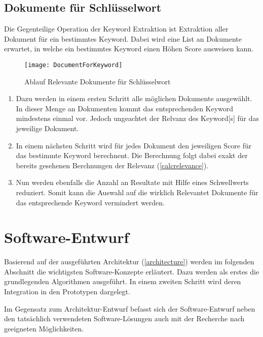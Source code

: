 \subsection{Dokumente für Schlüsselwort}
Die Gegenteilige Operation der \gls{Keyword} Extraktion ist Extraktion aller Dokument für ein bestimmtes  \gls{Keyword}. Dabei wird eine List an Dokumente erwartet, in welche ein bestimmtes \gls{Keyword} einen Höhen Score ausweisen kann. 

    \begin{figure}[H]
    \centering
    \texttt{[image: DocumentForKeyword]}
    \caption{Ablauf Relevante Dokumente für Schlüsselwort}
    \label{fig:seqdocforkeyword}
    \end{figure}
\begin{enumerate}
    \item  Dazu werden in einem ersten Schritt alle möglichen Dokumente ausgewählt. In dieser Menge an Dokumenten kommt das entsprechenden \gls{Keyword} mindestens einmal vor. Jedoch ungeachtet der Relvanz des \gls{Keyword}[s] für das jeweilige Dokument.
    \item In einem nächsten Schritt wird für jedes Dokument den jeweiligen Score für das bestimmte \gls{Keyword} berechnent. Die Berechnung folgt dabei exakt der bereits gesehenen Berchnungen der Relevanz (\autoref{calcrelevance}).

    \item Nun werden ebenfalls die Anzahl an Resultate mit Hilfe eines Schwellwerts reduziert. Somit kann die Auswahl auf die wirklich Relevantet Dokumente für das entsprechende \gls{Keyword} vermindert werden.
            
\end{enumerate}








\section{Software-Entwurf}
Basierend auf der ausgeführten Architektur (\autoref{architecture}) werden im folgenden Abschnitt die wichtigsten Software-Konzepte erläutert. Dazu werden als erstes die grundlegenden Algorithmen ausgeführt. In einem zweiten Schritt wird deren Integration in den Prototypen dargelegt.

Im Gegensatz zum Architektur-Entwurf befasst sich der Software-Entwurf neben den tatsächlich verwendeten Software-Lösungen auch mit der Recherche nach geeigneten Möglichkeiten.


